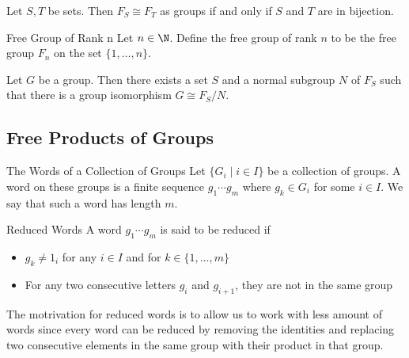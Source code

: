 \documentclass[a4paper]{article}
\begin{document}
\begin{prp}{}{} Let $S,T$ be sets. Then $F_S\cong F_T$ as groups if and only if $S$ and $T$ are in bijection. 
\end{prp}

\begin{defn}{Free Group of Rank n}{} Let $n\in\N$. Define the free group of rank $n$ to be the free group $F_n$ on the set $\{1,\dots,n\}$. 
\end{defn}

\begin{prp}{}{} Let $G$ be a group. Then there exists a set $S$ and a normal subgroup $N$ of $F_S$ such that there is a group isomorphism $G\cong F_S/N$. 
\end{prp}

\subsection{Free Products of Groups}
\begin{defn}{The Words of a Collection of Groups}{} Let $\{G_i\;|\;i\in I\}$ be a collection of groups. A word on these groups is a finite sequence $g_1\cdots g_m$ where $g_k\in G_i$ for some $i\in I$. We say that such a word has length $m$. 
\end{defn}

\begin{defn}{Reduced Words}{} A word $g_1\cdots g_m$ is said to be reduced if 
\begin{itemize}
\item $g_k\neq 1_i$ for any $i\in I$ and for $k\in\{1,\dots,m\}$
\item For any two consecutive letters $g_i$ and $g_{i+1}$, they are not in the same group
\end{itemize}
\end{defn}

The motrivation for reduced words is to allow us to work with less amount of words since every word can be reduced by removing the identities and replacing two consecutive elements in the same group with their product in that group. 
\end{document}
